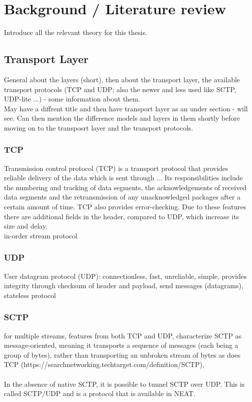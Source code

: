 \documentclass[12pt]{report}
\begin{document}
\chapter{Background / Literature review}

Introduce all the relevant theory for this thesis.

\section{Transport Layer}
General about the layers (short), then about the transport layer, the available transport protocols (TCP and UDP; also the newer and less used like SCTP, UDP-lite ...) - some information about them. \\
May have a diffrent title and then have transport layer as an under section - will see. Can then mention the difference models and layers in them shortly before moving on to the transposrt layer and the transport protocols.

\subsection{TCP}
Transmission control protocol (TCP) is a transport protocol that provides reliable delivery of the data which is sent through ... Its responsibilities include the numbering and tracking of data segments, the acknowledgements of received data segments and the retransmission of any unacknowledged packages after a certain amount of time. TCP also provides error-checking. Due to these features there are additional fields in the header, compared to UDP, which increase its size and delay. \\
in-order stream protocol

\subsection{UDP}
User datagram protocol (UDP): connectionless, fast, unreliable, simple, provides integrity through checksum of header and payload, send messages (datagrams), stateless protocol

\subsection{SCTP}
for multiple streams, features from both TCP and UDP, characterize SCTP as message-oriented, meaning it transports a sequence of messages (each being a group of bytes), rather than transporting an unbroken stream of bytes as does TCP (https://searchnetworking.techtarget.com/definition/SCTP), 
\\ \\
In the absence of native SCTP, it is possible to tunnel SCTP over UDP. This is called SCTP/UDP and is a protocol that is available in NEAT.
\end{document}
